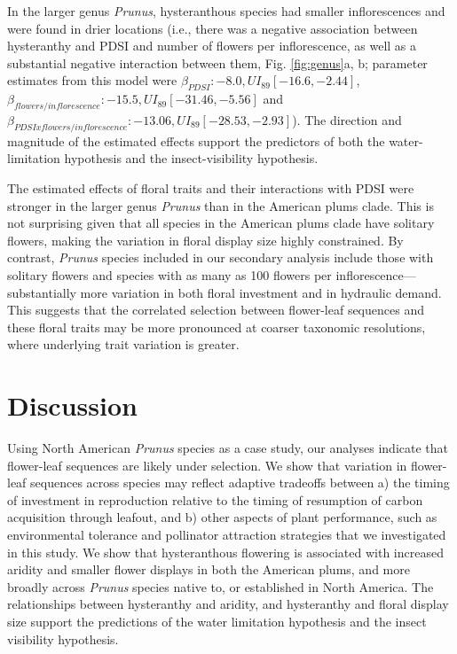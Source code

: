 \documentclass{article}[12pt]
\begin{document}
{In the larger genus \emph{Prunus}, hysteranthous species had smaller inflorescences and were found in drier locations (i.e., there was a negative association between hysteranthy and PDSI and number of flowers per inflorescence, as well as a substantial negative interaction between them, Fig. \ref{fig:genus}a, b; parameter estimates from this model were  $\beta_{PDSI}:-8.0, UI_{89}[-16.6,-2.44]$,  $\beta_{flowers/inflorescence}: -15.5, UI_{89}[-31.46,-5.56]$ and $\beta_{PDSI x flowers/inflorescence}: -13.06, UI_{89}[-28.53,-2.93]$).  The direction and magnitude of the estimated effects support the predictors of both the water-limitation hypothesis and the insect-visibility hypothesis.

The estimated effects of floral traits and their interactions with PDSI were stronger in the larger genus \emph{Prunus} than in the American plums clade.
This is not surprising given that all species in the American plums clade have solitary flowers, making the variation in floral display size highly constrained. By contrast, \emph{Prunus} species included in our secondary analysis include those with  solitary flowers and species with as many as 100 flowers per inflorescence---substantially more variation in both floral investment and in hydraulic demand. This suggests that the correlated selection between flower-leaf sequences and these floral traits may be more pronounced at coarser taxonomic resolutions, where underlying trait variation is greater.

\section*{Discussion}
Using North American \textit{Prunus} species as a case study, our analyses indicate that flower-leaf sequences are likely under selection. We show that variation in flower-leaf sequences across species may reflect adaptive tradeoffs between a) the timing of investment in reproduction relative to the timing of resumption of carbon acquisition through leafout, and b) other aspects of plant performance, such as environmental tolerance and pollinator attraction strategies that we investigated in this study. We show that hysteranthous flowering is associated with increased aridity and smaller flower displays in both the American plums, and more broadly across \emph{Prunus} species native to, or established in North America. The relationships between hysteranthy and aridity, and hysteranthy and floral display size support the predictions of the water limitation hypothesis and the insect visibility hypothesis. 

}
\end{document}

